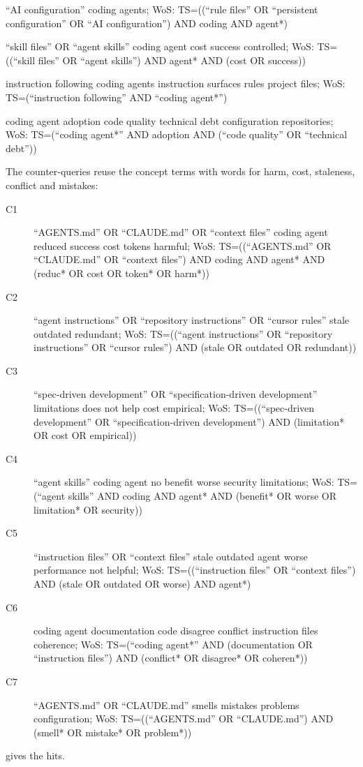 \begin{description}
    \enquote{AI configuration} coding agents; WoS: TS=((\enquote{rule files} OR
    \enquote{persistent configuration} OR \enquote{AI configuration}) AND
    coding AND agent*)
  \item[S12] \enquote{skill files} OR \enquote{agent skills} coding agent cost
    success controlled; WoS: TS=((\enquote{skill files} OR \enquote{agent
    skills}) AND agent* AND (cost OR success))
  \item[S13] instruction following coding agents instruction surfaces rules
    project files; WoS: TS=(\enquote{instruction following} AND \enquote{coding
    agent*})
  \item[S14] coding agent adoption code quality technical debt configuration
    repositories; WoS: TS=(\enquote{coding agent*} AND adoption AND
    (\enquote{code quality} OR \enquote{technical debt}))
\end{description}
The counter-queries reuse the concept terms with words for harm, cost,
staleness, conflict and mistakes:
\begin{description}
  \item[C1] \enquote{AGENTS.md} OR \enquote{CLAUDE.md} OR \enquote{context
    files} coding agent reduced success cost tokens harmful; WoS:
    TS=((\enquote{AGENTS.md} OR \enquote{CLAUDE.md} OR \enquote{context files})
    AND coding AND agent* AND (reduc* OR cost OR token* OR harm*))
  \item[C2] \enquote{agent instructions} OR \enquote{repository instructions}
    OR \enquote{cursor rules} stale outdated redundant; WoS:
    TS=((\enquote{agent instructions} OR \enquote{repository instructions} OR
    \enquote{cursor rules}) AND (stale OR outdated OR redundant))
  \item[C3] \enquote{spec-driven development} OR \enquote{specification-driven
    development} limitations does not help cost empirical; WoS:
    TS=((\enquote{spec-driven development} OR \enquote{specification-driven
    development}) AND (limitation* OR cost OR empirical))
  \item[C4] \enquote{agent skills} coding agent no benefit worse security
    limitations; WoS: TS=(\enquote{agent skills} AND coding AND agent* AND
    (benefit* OR worse OR limitation* OR security))
  \item[C5] \enquote{instruction files} OR \enquote{context files} stale
    outdated agent worse performance not helpful; WoS:
    TS=((\enquote{instruction files} OR \enquote{context files}) AND (stale OR
    outdated OR worse) AND agent*)
  \item[C6] coding agent documentation code disagree conflict instruction files
    coherence; WoS: TS=(\enquote{coding agent*} AND (documentation OR
    \enquote{instruction files}) AND (conflict* OR disagree* OR coheren*))
  \item[C7] \enquote{AGENTS.md} OR \enquote{CLAUDE.md} smells mistakes problems
    configuration; WoS: TS=((\enquote{AGENTS.md} OR \enquote{CLAUDE.md}) AND
    (smell* OR mistake* OR problem*))
\end{description}
 gives the hits.

